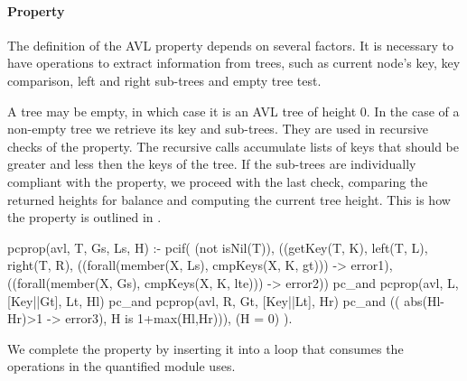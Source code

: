 




\paragraph{\bf Property}


The definition of the AVL property depends on several factors.
%
It is necessary to have operations to extract information from trees,
such as current node's key, key comparison, left and
right sub-trees and empty tree test.


A tree may be empty, in which case it is an AVL tree of height 0.
%
In the case of a non-empty tree we retrieve its key and sub-trees.
%
They are used in recursive checks of the property.
%
The recursive calls accumulate lists of keys that should be greater and
less then the keys of the tree.
%
If the sub-trees are individually compliant with the property, we
proceed with the last check, comparing the returned heights for
balance and computing the current tree height.
%
This is how the property is outlined in \plqc{}.
%
\begin{yapcode}
pcprop({avl, T, Gs, Ls, H}) :- pcif( (not isNil(T)),
 ((getKey(T, K), left(T, L),  right(T, R),
      ((forall(member(X, Ls), cmpKeys(X, K, gt))) -> error1),
      ((forall(member(X, Gs), cmpKeys(X, K, lte))) -> error2))
   pc_and pcprop({avl, L, [Key||Gt], Lt, Hl})
   pc_and pcprop({avl, R, Gt, [Key||Lt], Hr})
   pc_and (( abs(Hl-Hr)>1 -> error3), H is 1+max(Hl,Hr))),
 (H = 0) ).
\end{yapcode}
%
We complete the property by inserting it into a loop that consumes the
operations in the quantified module uses.



